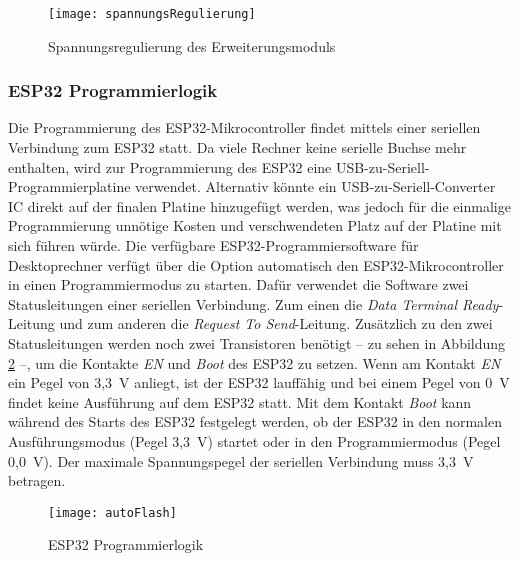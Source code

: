 \begin{figure}[h]
    \centering
    \texttt{[image: spannungsRegulierung]}
    \caption{Spannungsregulierung des Erweiterungsmoduls}
    \label{fig:spannungsRegulierung}
\end{figure}

\subsubsection{ESP32 Programmierlogik}
Die Programmierung des ESP32-Mikrocontroller findet mittels einer seriellen Verbindung zum ESP32 statt. Da viele Rechner keine serielle Buchse mehr enthalten, wird zur Programmierung des ESP32 eine USB-zu-Seriell-Programmierplatine verwendet. Alternativ könnte ein USB-zu-Seriell-Converter \ac{IC} direkt auf der finalen Platine hinzugefügt werden, was jedoch für die einmalige Programmierung unnötige Kosten und verschwendeten Platz auf der Platine mit sich führen würde. Die verfügbare ESP32-Programmiersoftware für Desktoprechner verfügt über die Option automatisch den ESP32-Mikrocontroller in einen Programmiermodus zu starten. Dafür verwendet die Software zwei Statusleitungen einer seriellen Verbindung. Zum einen die \textit{Data Terminal Ready}-Leitung und zum anderen die \textit{Request To Send}-Leitung. Zusätzlich zu den zwei Statusleitungen werden noch zwei Transistoren benötigt -- zu sehen in Abbildung \ref{fig:autoFlash} --, um die Kontakte \textit{EN} und \textit{Boot} des ESP32 zu setzen. Wenn am Kontakt \textit{EN} ein Pegel von 3,3~V anliegt, ist der ESP32 lauffähig und bei einem Pegel von 0~V findet keine Ausführung auf dem ESP32 statt. Mit dem Kontakt \textit{Boot} kann während des Starts des ESP32 festgelegt werden, ob der ESP32 in den normalen Ausführungsmodus (Pegel 3,3~V) startet oder in den Programmiermodus (Pegel 0,0~V). Der maximale Spannungspegel der seriellen Verbindung muss 3,3~V betragen.

\begin{figure}[h]
    \centering
    \texttt{[image: autoFlash]}
    \caption{ESP32 Programmierlogik}
    \label{fig:autoFlash}
\end{figure}

